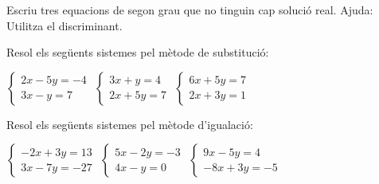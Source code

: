 \begin{activitats}
\begin{mylist}
\exer  Escriu tres equacions de segon grau que no tinguin cap solució real. Ajuda: Utilitza el discriminant.
\begin{comment}

\exer  Escriu tres equacions de segon grau que tinguin una solució doble.

\exer  Escriu tres equacions de segon grau que tinguin dues solucions reals i diferents.

\exer  Podries escriure una equació de segon grau amb únicament una solució real que no fos doble?
\end{comment}
\end{mylist}


 
\begin{mylist}


\exer  Resol els següents sistemes pel mètode de substitució:

\begin{tasks}
	\task  $\left\{\begin{array}{c} {2x-5y=-4} \\ {3x-y=7} \end{array}\right. $  
	\task  $\left\{\begin{array}{c} {3x+y=4} \\ {2x+5y=7} \end{array}\right. $  
	\task  $\left\{\begin{array}{c} {6x+5y=7} \\ {2x+3y=1} \end{array}\right. $
\end{tasks}
\answers{[$(3,2)$, $(1,1)$, $(2,-1)$]}

\exer  Resol els següents sistemes pel mètode d'igualació:

\begin{tasks}
	\task  $\left\{\begin{array}{c} {-2x+3y=13} \\ {3x-7y=-27} \end{array}\right. $  
	\task  $\left\{\begin{array}{c} {5x-2y=-3} \\ {4x-y=0} \end{array}\right. $  
	\task  $\left\{\begin{array}{c} {9x-5y=4} \\ {-8x+3y=-5} \end{array}\right. $
\end{tasks}
\answers{[$(-2,3)$, $(1,4)$, $(1,1)$]}



\end{mylist}
\end{activitats}
